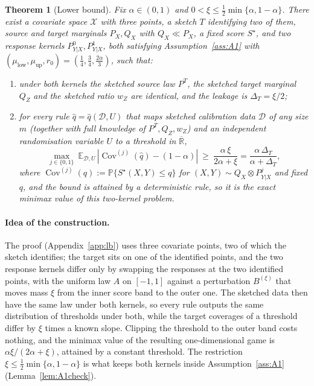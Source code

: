 \documentclass[11pt,a4paper]{article}
\newcommand{\PX}{P_X}
\newcommand{\QX}{Q_X}
\newcommand{\abs}[1]{\left|#1\right|}
\newcommand{\Cov}{\operatorname{Cov}}
\newcommand{\E}{\mathbb{E}}
\newcommand{\Prob}{\mathbb{P}}
\newcommand{\Rbar}{\overline{\mathbb{R}}}
\theoremstyle{plain}
\newtheorem{theorem}{Theorem}[section]
\theoremstyle{definition}
\theoremstyle{remark}
\begin{document}
\begin{theorem}[Lower bound]\label{thm:lb}
Fix $\alpha\in(0,1)$ and $0<\xi\le\tfrac12\min\{\alpha,1-\alpha\}$. There exist a covariate space $\mathcal X$ with three points, a sketch $T$ identifying two of them, source and target marginals $\PX,\QX$ with $\QX\ll\PX$, a fixed score $S^\star$, and two response kernels $P^0_{Y|X},P^1_{Y|X}$, both satisfying Assumption~\ref{ass:A1} with $(\mu_{\mathrm{low}},\mu_{\mathrm{up}},r_0)=(\tfrac14,\tfrac34,\tfrac{2\alpha}{3})$, such that:
\begin{enumerate}[leftmargin=1.8em,itemsep=1pt]
\item[(a)] under both kernels the sketched source law $P^T$, the sketched target marginal $Q_Z$ and the sketched ratio $w_Z$ are identical, and the leakage is $\Delta_T=\xi/2$;
\item[(b)] for every rule $\widehat q=\widehat q(\mathcal D,U)$ that maps sketched calibration data $\mathcal D$ of any size $m$ (together with full knowledge of $P^T,Q_Z,w_Z$) and an independent randomisation variable $U$ to a threshold in $\Rbar$,
\[
\max_{j\in\{0,1\}}\ \E_{\mathcal D,U}\,\abs{\Cov^{(j)}(\widehat q)-(1-\alpha)}\ \ge\ \frac{\alpha\,\xi}{2\alpha+\xi}=\frac{\alpha\,\Delta_T}{\alpha+\Delta_T},
\]
where $\Cov^{(j)}(q):=\Prob\{S^\star(X,Y)\le q\}$ for $(X,Y)\sim\QX\otimes P^j_{Y|X}$ and fixed $q$,
and the bound is attained by a deterministic rule, so it is the exact minimax value of this two-kernel problem.
\end{enumerate}
\end{theorem}
\paragraph{Idea of the construction.}
The proof (Appendix~\ref{app:lb}) uses three covariate points, two of which the sketch identifies; the target sits on one of the identified points, and the two response kernels differ only by swapping the responses at the two identified points, with the uniform law $A$ on $[-1,1]$ against a perturbation $B^{(\xi)}$ that moves mass $\xi$ from the inner score band to the outer one. The sketched data then have the same law under both kernels, so every rule outputs the same distribution of thresholds under both, while the target coverages of a threshold differ by $\xi$ times a known slope. Clipping the threshold to the outer band costs nothing, and the minimax value of the resulting one-dimensional game is $\alpha\xi/(2\alpha+\xi)$, attained by a constant threshold. The restriction $\xi\le\tfrac12\min\{\alpha,1-\alpha\}$ is what keeps both kernels inside Assumption~\ref{ass:A1} (Lemma~\ref{lem:A1check}).
\end{document}
